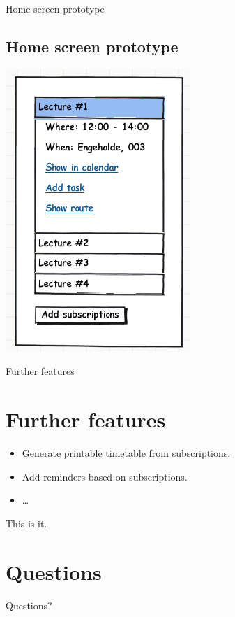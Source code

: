 \documentclass{beamer}
\begin{document}
\begin{frame}{Home screen prototype}
	\subsection{Home screen prototype}
	
	\begin{center}
		\includegraphics[scale=0.5]{home.png}
	\end{center}

\end{frame}

\begin{frame}{Further features}

	\section{Further features}
	
	\begin{itemize}
		\item Generate printable timetable from subscriptions.
		\item Add reminders based on subscriptions.
		\item \ldots
	\end{itemize}
\end{frame}
	
\begin{frame}{This is it.}
\section{Questions}
Questions?
\end{frame}
\end{document}

